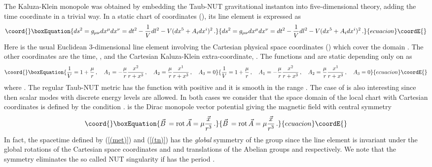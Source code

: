 \documentclass[a4paper,12pt]{article}
\begin{document}
The Kaluza-Klein monopole \cite{GP,So} was obtained by embedding the 
Taub-NUT gravitational instanton into five-dimensional theory, adding 
the time coordinate in a trivial way. In a static chart of 
coordinates \coordHE{} (\coordHE{}), its line element is 
expressed as
\begin{equation}\coord{}\boxEquation{\label{(met)} 
ds^{2}=g_{\mu\nu}dx^{\mu}dx^{\nu}=dt^{2}-\frac{1}{V}dl^{2}-V(dx^{5}+
A_{i}dx^{i})^{2}\,.
}{ds^{2}=g_{\mu\nu}dx^{\mu}dx^{\nu}=dt^{2}-\frac{1}{V}dl^{2}-V(dx^{5}+
A_{i}dx^{i})^{2}\,.
}{ecuacion}\coordE{}\end{equation}   
Here \coordHE{}
is the usual Euclidean 3-dimensional line element involving the Cartesian 
physical space coordinates \coordHE{} (\coordHE{}) which 
cover the domain \coordHE{}. The other coordinates are the time, \coordHE{}, and 
the Cartesian Kaluza-Klein extra-coordinate, \coordHE{}. 
The functions  \coordHE{} and \coordHE{} are static  depending only on \coordHE{} as     
\begin{equation}\coord{}\boxEquation{\label{(tn)}
\frac{1}{V}=1+\frac{\mu}{r}\,,\quad A_{1}=-\frac{\mu}{r}\frac{x^{2}}
{r+x^{3}}\,,\quad 
A_{2}=\frac{\mu}{r}\frac{x^{1}}{r+x^{3}}\,,\quad A_{3}=0 
}{\frac{1}{V}=1+\frac{\mu}{r}\,,\quad A_{1}=-\frac{\mu}{r}\frac{x^{2}}
{r+x^{3}}\,,\quad 
A_{2}=\frac{\mu}{r}\frac{x^{1}}{r+x^{3}}\,,\quad A_{3}=0 
}{ecuacion}\coordE{}\end{equation}
where \coordHE{}. The regular Taub-NUT metric has the function \coordHE{} 
with \myHighlight{$\mu$}\coordHE{} positive and it is smooth in the range \coordHE{}.  
The case of \coordHE{} is also interesting since then scalar modes with discrete 
energy levels are allowed. In both cases  we consider that the space 
domain of the local chart with Cartesian coordinates is defined by the 
condition \coordHE{}.  \coordHE{} 
is the Dirac monopole vector potential giving the  magnetic field 
with central symmetry
\begin{equation}\coord{}\boxEquation{
\vec{B}\,={\rm rot}\, \vec{A}=\mu\frac{\vec{x}}{r^3}\,.
}{
\vec{B}\,={\rm rot}\, \vec{A}=\mu\frac{\vec{x}}{r^3}\,.
}{ecuacion}\coordE{}\end{equation}
In fact,  the  spacetime defined by (\ref{(met)}) and (\ref{(tn)}) has the 
{\em global} symmetry 
of the  group \coordHE{} since  
the line element is invariant under the global rotations of the Cartesian space 
coordinates and  \coordHE{} and \coordHE{} translations of the Abelian groups 
\coordHE{} and \coordHE{} respectively. We note that the \coordHE{} symmetry 
eliminates the so called NUT singularity  if \coordHE{} has the period 
\myHighlight{$4\pi\mu$}\coordHE{}. 
\end{document}
